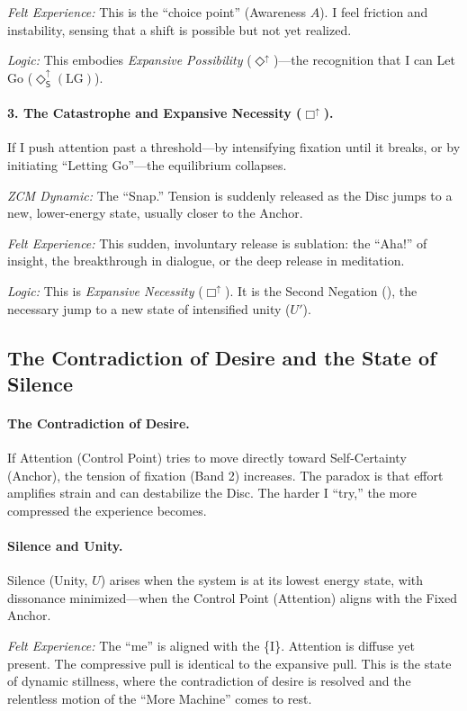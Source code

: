 \documentclass[12pt]{book}
\newcommand{\SDiaUp}{\Diamond_{\mathsf{S}}^{\uparrow}}
\begin{document}
\textit{Felt Experience:} This is the ``choice point'' (Awareness $A$). I feel friction and instability, sensing that a shift is possible but not yet realized.

\textit{Logic:} This embodies \textit{Expansive Possibility} ($\Diamond^{\uparrow}$)---the recognition that I can Let Go ($\SDiaUp(\mathrm{LG})$).

\paragraph{3. The Catastrophe and Expansive Necessity ($\Box^{\uparrow}$).}
If I push attention past a threshold---by intensifying fixation until it breaks, or by initiating ``Letting Go''---the equilibrium collapses.

\textit{ZCM Dynamic:} The ``Snap.'' Tension is suddenly released as the Disc jumps to a new, lower-energy state, usually closer to the Anchor.

\textit{Felt Experience:} This sudden, involuntary release is sublation: the ``Aha!'' of insight, the breakthrough in dialogue, or the deep release in meditation.

\textit{Logic:} This is \textit{Expansive Necessity} ($\Box^{\uparrow}$). It is the Second Negation (), the necessary jump to a new state of intensified unity ($U'$).

\subsection{The Contradiction of Desire and the State of Silence}

\paragraph{The Contradiction of Desire.} If Attention (Control Point) tries to move directly toward Self-Certainty (Anchor), the tension of fixation (Band 2) increases. The paradox is that effort amplifies strain and can destabilize the Disc. The harder I ``try,'' the more compressed the experience becomes.

\paragraph{Silence and Unity.} Silence (Unity, $U$) arises when the system is at its lowest energy state, with dissonance minimized---when the Control Point (Attention) aligns with the Fixed Anchor.

\textit{Felt Experience:} The ``me'' is aligned with the \{I\}. Attention is diffuse yet present. The compressive pull is identical to the expansive pull. This is the state of dynamic stillness, where the contradiction of desire is resolved and the relentless motion of the ``More Machine'' comes to rest.
\end{document}
